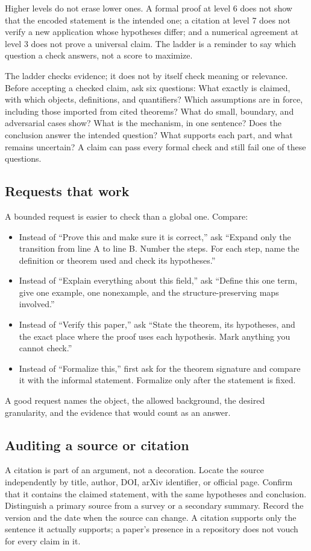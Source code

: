 Higher levels do not erase lower ones. A formal proof at level 6 does not show that the encoded statement is the intended one; a citation at level 7 does not verify a new application whose hypotheses differ; and a numerical agreement at level 3 does not prove a universal claim. The ladder is a reminder to say which question a check answers, not a score to maximize.

The ladder checks evidence; it does not by itself check meaning or relevance. Before accepting a checked claim, ask six questions: What exactly is claimed, with which objects, definitions, and quantifiers? Which assumptions are in force, including those imported from cited theorems? What do small, boundary, and adversarial cases show? What is the mechanism, in one sentence? Does the conclusion answer the intended question? What supports each part, and what remains uncertain? A claim can pass every formal check and still fail one of these questions.

\subsection*{Requests that work}
A bounded request is easier to check than a global one. Compare:

\begin{itemize}
\item Instead of ``Prove this and make sure it is correct,'' ask ``Expand only the transition from line A to line B. Number the steps. For each step, name the definition or theorem used and check its hypotheses.''
\item Instead of ``Explain everything about this field,'' ask ``Define this one term, give one example, one nonexample, and the structure-preserving maps involved.''
\item Instead of ``Verify this paper,'' ask ``State the theorem, its hypotheses, and the exact place where the proof uses each hypothesis. Mark anything you cannot check.''
\item Instead of ``Formalize this,'' first ask for the theorem signature and compare it with the informal statement. Formalize only after the statement is fixed.
\end{itemize}

A good request names the object, the allowed background, the desired granularity, and the evidence that would count as an answer.

\subsection*{Auditing a source or citation}
A citation is part of an argument, not a decoration. Locate the source independently by title, author, DOI, arXiv identifier, or official page. Confirm that it contains the claimed statement, with the same hypotheses and conclusion. Distinguish a primary source from a survey or a secondary summary. Record the version and the date when the source can change. A citation supports only the sentence it actually supports; a paper's presence in a repository does not vouch for every claim in it.


